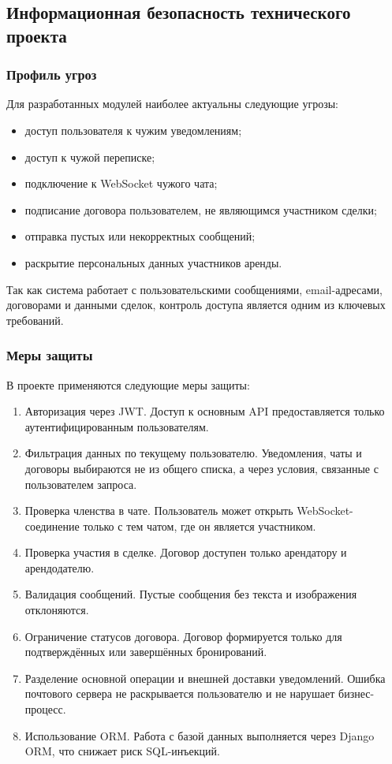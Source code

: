 \subsection{Информационная безопасность технического проекта}
\subsubsection{Профиль угроз}
Для разработанных модулей наиболее актуальны следующие угрозы:
\begin{itemize}
    \item доступ пользователя к чужим уведомлениям;
    \item доступ к чужой переписке;
    \item подключение к WebSocket чужого чата;
    \item подписание договора пользователем, не являющимся участником сделки;
    \item отправка пустых или некорректных сообщений;
    \item раскрытие персональных данных участников аренды.
\end{itemize}

Так как система работает с пользовательскими сообщениями, email-адресами, договорами и данными сделок, контроль доступа является одним из ключевых требований.

\subsubsection{Меры защиты}
В проекте применяются следующие меры защиты:
\begin{enumerate}
    \item Авторизация через JWT. Доступ к основным API предоставляется только аутентифицированным пользователям.
    \item Фильтрация данных по текущему пользователю. Уведомления, чаты и договоры выбираются не из общего списка, а через условия, связанные с пользователем запроса.
    \item Проверка членства в чате. Пользователь может открыть WebSocket-соединение только с тем чатом, где он является участником.
    \item Проверка участия в сделке. Договор доступен только арендатору и арендодателю.
    \item Валидация сообщений. Пустые сообщения без текста и изображения отклоняются.
    \item Ограничение статусов договора. Договор формируется только для подтверждённых или завершённых бронирований.
    \item Разделение основной операции и внешней доставки уведомлений. Ошибка почтового сервера не раскрывается пользователю и не нарушает бизнес-процесс.
    \item Использование ORM. Работа с базой данных выполняется через Django ORM, что снижает риск SQL-инъекций.
\end{enumerate}
